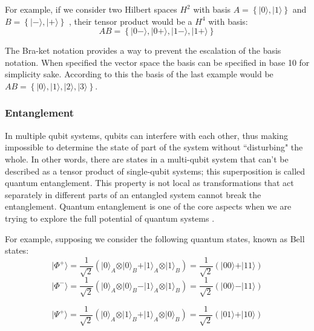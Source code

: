 For example, if we consider two Hilbert spaces $H^2$ with basis
$ A=\left\{ \vert 0 \rangle , \vert 1 \rangle \right\}$ and 
$B =\left\{ \vert - \rangle, \vert + \rangle \right\}$
, their tensor product would be a $H^4$ with basis:
\begin{equation}
AB = \left\{ \vert 0  - \rangle, \vert 0 + \rangle, \vert 1 - \rangle,  \vert 1 + \rangle \right\}
\end{equation}

The Bra-ket notation provides a way to prevent the escalation of the basis notation. When specified the vector space the basis can be specified in base 10 for simplicity sake. According to this the basis of the last example would be $AB = \left\{ \vert 0 \rangle, \vert 1 \rangle, \vert 2 \rangle,  \vert 3 \rangle \right\}$.

\subsubsection{Entanglement}
In multiple qubit systems, qubits can interfere with each other, thus making impossible to determine the state of part of the system without ``disturbing" the whole. In other words, there are states in a multi-qubit system that can't be described as a tensor product of single-qubit systems; this superposition is called quantum entanglement. This property is not local as transformations that act separately in different parts of an entangled system cannot break the entanglement. Quantum entanglement is one of the core aspects when we are trying to explore the full potential of quantum systems \cite{Rieffel2011}.

For example, supposing we consider the following quantum states, known as Bell states:
\begin{equation}
\vert\Phi^{+}\rangle=\frac{1}{\sqrt{2}}(\vert0\rangle_{A} \otimes\vert0\rangle_{B} +\vert1\rangle_{A} \otimes\vert1\rangle_{B})=\frac{1}{\sqrt{2}}(\vert00\rangle+\vert11\rangle)
\end{equation}
\begin{equation}
\vert\Phi^{-}\rangle=\frac{1}{\sqrt{2}}(\vert0\rangle_{A} \otimes\vert0\rangle_{B} -\vert1\rangle_{A} \otimes\vert1\rangle_{B})=\frac{1}{\sqrt{2}}(\vert00\rangle-\vert11\rangle)
\end{equation}


\begin{equation}
\vert\Psi^{+}\rangle=\frac{1}{\sqrt{2}}(\vert0\rangle_{A} \otimes\vert1\rangle_{B} +\vert1\rangle_{A}\otimes\vert0\rangle_{B})=\frac{1}{\sqrt{2}}(\vert01\rangle+\vert10\rangle)
\end{equation}


